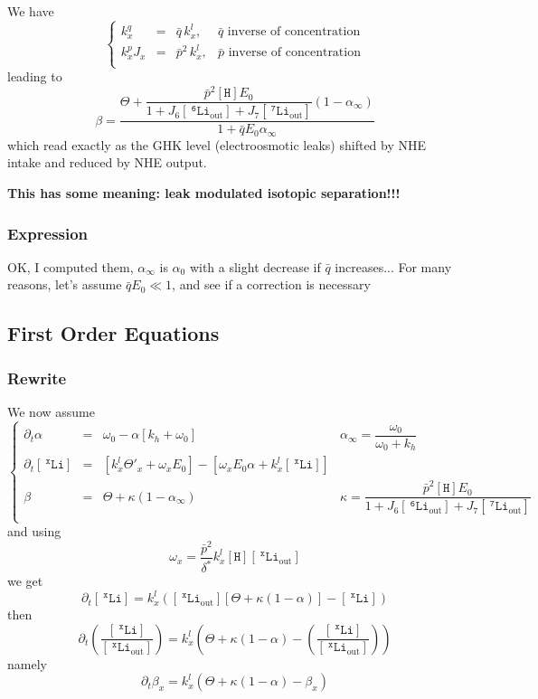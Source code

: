 \documentclass[aps,onecolumn,12pt]{revtex4}
\newcommand{\mychem}[1]{\mathtt{#1}}
\newcommand{\myconc}[1]{\left\lbrack{#1}\right\rbrack}
\newcommand{\spLi}[1]{{~^{\mychem{#1}}\mychem{Li}}}
\newcommand{\Li}[1]{\myconc{\spLi{#1}}}
\newcommand{\spLiOut}[1]{{\spLi{#1}}_{\mathrm{out}}}
\newcommand{\LiOut}[1]{\myconc{\spLiOut{#1}}}
\newcommand{\spproton}{\mychem{H}}
\newcommand{\proton}{\myconc{\spproton}}
\begin{document}
We have
\begin{equation}
\left\lbrace
	\begin{array}{rcll}
	k_x^q    & = & \bar{q}\,k_x^l,  &  \bar{q}\text{ inverse of concentration}\\
	k_x^pJ_x & = & \bar{p}^2\,k_x^l, & \bar{p}\text{ inverse of concentration}\\
	\end{array}
\right.
\end{equation}
leading to
\begin{equation}
	\beta = \dfrac{\Theta+\dfrac{\bar{p}^2 \proton E_0}{1+J_6\LiOut{6}+J_7\LiOut{7}} \left(1-\alpha_\infty\right)}{1+\bar{q}E_0\alpha_\infty}
\end{equation}
which read exactly as the GHK level (electroosmotic leaks) shifted by NHE intake and reduced by NHE output.

\centerline{\bf This has some meaning: leak modulated isotopic separation!!!}

\subsubsection{Expression}
OK, I computed them, $\alpha_\infty$ is $\alpha_0$ with a slight decrease if $\bar{q}$ increases...
For many reasons, let's assume $\bar{q}E_0\ll 1$, and see if a correction is necessary

\subsection{First Order Equations}
\subsubsection{Rewrite}
We now assume
\begin{equation}
\left\lbrace
\begin{array}{rcll}
	\partial_t\alpha    & = & \omega_0 - \alpha\left\lbrack k_h+\omega_0\right\rbrack & \alpha_\infty = \dfrac{\omega_0}{\omega_0+k_h}\\
	\partial_t\Li{x} & = & \left\lbrack k_x^l\Theta'_x+\omega_x E_0\right\rbrack
		-\left\lbrack
			\omega_x E_0\alpha +  k_x^l\Li{x}
		\right\rbrack & \\
	\beta & = & \Theta + \kappa \left(1-\alpha_\infty\right) & \kappa = \dfrac{\bar{p}^2 \proton E_0}{1+J_6\LiOut{6}+J_7\LiOut{7}} \\
	\end{array}
\right.
\end{equation}
and using
$$
	\omega_x =  \dfrac{\bar{p}^2}{\delta^\ast} k_x^l\proton \LiOut{x}
$$
we get
$$
	\partial_t\Li{x} =
	  k_x^l \left(\LiOut{x} \left[ \Theta + \kappa \left(1-\alpha\right)\right] - \Li{x} \right)
$$
then
\begin{equation}
	\partial_t\left( \dfrac{\Li{x}}{\LiOut{x}} \right)= k_x^l \left( \Theta + \kappa(1-\alpha) - \left( \dfrac{\Li{x}}{\LiOut{x}} \right)\right)
\end{equation}
namely
\begin{equation}
	\partial_t \beta_x =  k_x^l \left( \Theta + \kappa(1-\alpha) - \beta_x\right)
\end{equation}
\end{document}
